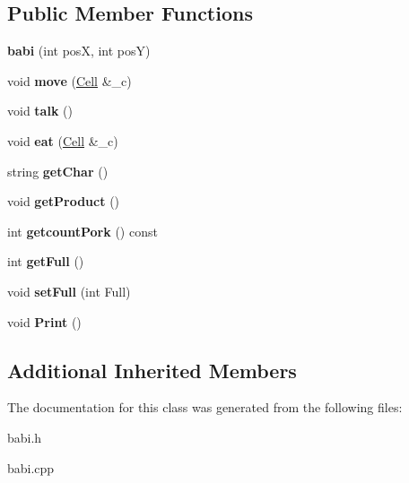 \subsection*{Public Member Functions}
\begin{DoxyCompactItemize}
\item 
\mbox{\label{classbabi_a8a0eaad29a7457b8f0a8c21c658f9a05}} 
{\bfseries babi} (int posX, int posY)
\item 
\mbox{\label{classbabi_a944fb4f134cf9bf637a0855a4918d684}} 
void {\bfseries move} (\hyperlink{classCell}{Cell} \&\+\_\+c)
\item 
\mbox{\label{classbabi_a2c18230abf410234e222bca1effe4d40}} 
void {\bfseries talk} ()
\item 
\mbox{\label{classbabi_a6832fa65d6d5bd0838603c7496f6c3f1}} 
void {\bfseries eat} (\hyperlink{classCell}{Cell} \&\+\_\+c)
\item 
\mbox{\label{classbabi_ab439b42715b304718d2176379ba168c4}} 
string {\bfseries get\+Char} ()
\item 
\mbox{\label{classbabi_ae806759f4a9e17689c9056512173ef0e}} 
void {\bfseries get\+Product} ()
\item 
\mbox{\label{classbabi_af3f2e9d1b45c036f751a0f1e7aa64c32}} 
int {\bfseries getcount\+Pork} () const
\item 
\mbox{\label{classbabi_a719415a9f2472843122d5f2c7e5920fa}} 
int {\bfseries get\+Full} ()
\item 
\mbox{\label{classbabi_abd5372713081247b04ea16042f81d940}} 
void {\bfseries set\+Full} (int Full)
\item 
\mbox{\label{classbabi_ad84b011867ac045d89c273fe155c91e4}} 
void {\bfseries Print} ()
\end{DoxyCompactItemize}
\subsection*{Additional Inherited Members}


The documentation for this class was generated from the following files\+:\begin{DoxyCompactItemize}
\item 
babi.\+h\item 
babi.\+cpp\end{DoxyCompactItemize}
